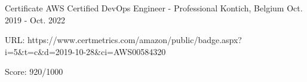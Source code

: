 \begin{cventries}
  \cventry
    {Certificate} %
    {AWS Certified DevOps Engineer - Professional} %
    {Kontich, Belgium} %
    {Oct. 2019 - Oct. 2022} %
    {
      \begin{cvitems} %
        \item {URL: https://www.certmetrics.com/amazon/public/badge.aspx?i=5\&t=c\&d=2019-10-28\&ci=AWS00584320}
        \item {Score: 920/1000}
      \end{cvitems}
    }


\end{cventries}
